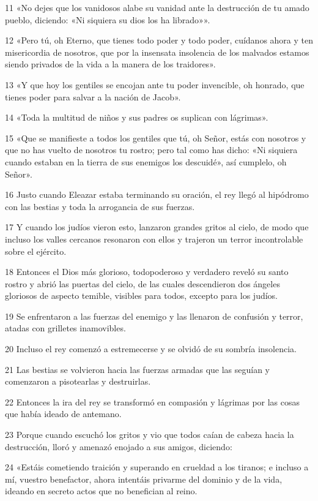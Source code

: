 \par 11 «No dejes que los vanidosos alabe su vanidad ante la destrucción de tu amado pueblo, diciendo: «Ni siquiera su dios los ha librado»».
\par 12 «Pero tú, oh Eterno, que tienes todo poder y todo poder, cuídanos ahora y ten misericordia de nosotros, que por la insensata insolencia de los malvados estamos siendo privados de la vida a la manera de los traidores».
\par 13 «Y que hoy los gentiles se encojan ante tu poder invencible, oh honrado, que tienes poder para salvar a la nación de Jacob».
\par 14 «Toda la multitud de niños y sus padres os suplican con lágrimas».
\par 15 «Que se manifieste a todos los gentiles que tú, oh Señor, estás con nosotros y que no has vuelto de nosotros tu rostro; pero tal como has dicho: «Ni siquiera cuando estaban en la tierra de sus enemigos los descuidé», así cumplelo, oh Señor».
\par 16 Justo cuando Eleazar estaba terminando su oración, el rey llegó al hipódromo con las bestias y toda la arrogancia de sus fuerzas.
\par 17 Y cuando los judíos vieron esto, lanzaron grandes gritos al cielo, de modo que incluso los valles cercanos resonaron con ellos y trajeron un terror incontrolable sobre el ejército.
\par 18 Entonces el Dios más glorioso, todopoderoso y verdadero reveló su santo rostro y abrió las puertas del cielo, de las cuales descendieron dos ángeles gloriosos de aspecto temible, visibles para todos, excepto para los judíos.
\par 19 Se enfrentaron a las fuerzas del enemigo y las llenaron de confusión y terror, atadas con grilletes inamovibles.
\par 20 Incluso el rey comenzó a estremecerse y se olvidó de su sombría insolencia.
\par 21 Las bestias se volvieron hacia las fuerzas armadas que las seguían y comenzaron a pisotearlas y destruirlas.
\par 22 Entonces la ira del rey se transformó en compasión y lágrimas por las cosas que había ideado de antemano.
\par 23 Porque cuando escuchó los gritos y vio que todos caían de cabeza hacia la destrucción, lloró y amenazó enojado a sus amigos, diciendo:
\par 24 «Estáis cometiendo traición y superando en crueldad a los tiranos; e incluso a mí, vuestro benefactor, ahora intentáis privarme del dominio y de la vida, ideando en secreto actos que no benefician al reino.
